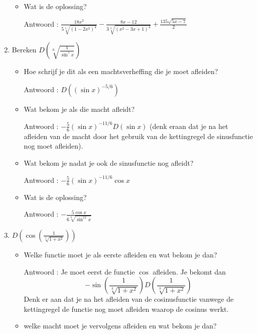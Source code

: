 \documentclass{article}
\begin{document}
\begin{enumerate}
\begin{itemize}
\item Wat is de oplossing?

Antwoord : $\frac{18x^2}{5\sqrt[5]{\left( 1-2x^3 \right) ^4}}-\frac{8x-12}{3\sqrt[3]{\left( x^2-3x+1 \right)^4}}+\frac{135 \sqrt{5x-7}}{2}$

\end{itemize}

\item Bereken $D \left( \sqrt[6]{\frac{1}{\sin ^5x}}  \right)$

\begin{itemize}

\item Hoe schrijf je dit als een machtsverheffing die je moet afleiden?

Antwoord : $D \left( (\sin x)^{-5/6}  \right)$

\item Wat bekom je als die macht afleidt? 

Antwoord : $-\frac{5}{6} (\sin x)^{-11/6} D(\sin x)$ (denk eraan dat je na het afleiden van de macht door het gebruik van de kettingregel de sinusfunctie nog moet afleiden).

\item Wat bekom je nadat je ook de sinusfunctie nog afleidt?

Antwoord : $-\frac{5}{6} (\sin x)^{-11/6} \cos x$

\item Wat is de oplossing?

Antwoord : $-\frac{5 \cos x}{6 \sqrt[6]{\sin ^{11}x}}$

\end{itemize}

\item $D \left( \cos \left( \frac {1}{\sqrt[3]{1+x^2}}  \right)  \right)$

\begin{itemize}

\item Welke functie moet je als eerste afleiden en wat bekom je dan?

Antwoord : Je moet eerst de functie $\cos$ afleiden. Je bekomt dan
\[
-\sin \left(  \frac{1}{\sqrt[3]{1+x^2}} \right) D \left(  \frac{1}{\sqrt[3]{1+x^2}} \right) 
\]
Denk er aan dat je na het afleiden van de cosinusfunctie vanwege de kettingregel de functie nog moet afleiden waarop de cosinus werkt.

\item welke macht moet je vervolgens afleiden en wat bekom je dan?


\end{itemize}
\end{enumerate}
\end{document}
